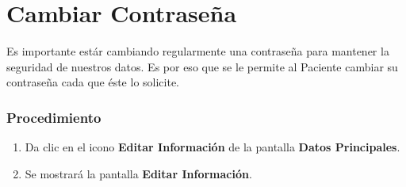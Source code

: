 \section{Cambiar Contraseña}

Es importante estár cambiando regularmente una contraseña para mantener la seguridad de nuestros datos. Es por eso que se le permite al Paciente cambiar su contraseña cada que éste lo solicite.

\subsubsection{Procedimiento}
\begin{enumerate}
	
	\item Da clic en el icono \textbf{Editar Información} de la pantalla \textbf{Datos Principales}.

	\item Se mostrará la pantalla \textbf{Editar Información}.
	

\end{enumerate}
